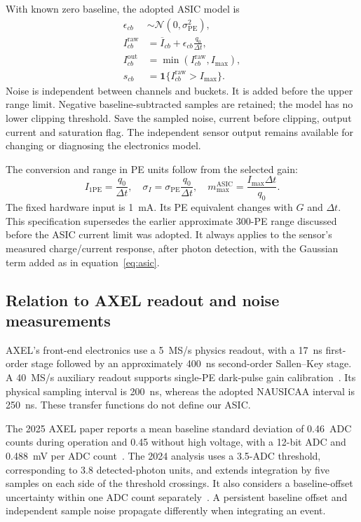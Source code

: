 \documentclass[11pt]{article}
\newcommand{\PE}{\mathrm{PE}}
\begin{document}
With known zero baseline, the adopted ASIC model is
\begin{align}
 \epsilon_{cb}&\sim\mathcal N(0,\sigma_{\PE}^2),\\
 I^{\mathrm{raw}}_{cb}&=\overline I_{cb}
       +\epsilon_{cb}\frac{q_0}{\Delta t},\\
 I^{\mathrm{out}}_{cb}&=\min(I^{\mathrm{raw}}_{cb},I_{\max}),\\
 s_{cb}&=\boldsymbol{1}\{I^{\mathrm{raw}}_{cb}>I_{\max}\}.
 \label{eq:asic}
\end{align}
Noise is independent between channels and buckets. It is added before the
upper range limit. Negative baseline-subtracted samples are retained; the
model has no lower clipping threshold. Save the sampled noise, current before
clipping, output current and saturation flag. The independent sensor output
remains available for changing or diagnosing the electronics model.

The conversion and range in PE units follow from the selected gain:
\begin{equation}
 I_{1\PE}=\frac{q_0}{\Delta t},\quad
 \sigma_I=\sigma_{\PE}\frac{q_0}{\Delta t},\quad
 m_{\max}^{\mathrm{ASIC}}=\frac{I_{\max}\Delta t}{q_0}.
 \label{eq:range}
\end{equation}
The fixed hardware input is 1~mA. Its PE equivalent changes with $G$ and
$\Delta t$. This specification supersedes the earlier approximate 300-PE
range discussed before the ASIC current limit was adopted. It always applies
to the sensor's measured charge/current response, after photon detection,
with the Gaussian term added as in equation~\eqref{eq:asic}.

\subsection{Relation to AXEL readout and noise measurements}
AXEL's front-end electronics use a 5~MS/s physics readout, with a 17~ns
first-order stage followed by an approximately 400~ns second-order
Sallen--Key stage. A 40~MS/s auxiliary readout supports single-PE dark-pulse
gain calibration~\cite{Nakamura2020AxFEB}. Its physical sampling interval is
200~ns, whereas the adopted NAUSICAA interval is 250~ns. These transfer
functions do not define our ASIC.

The 2025 AXEL paper reports a mean baseline standard deviation of 0.46~ADC
counts during operation and 0.45 without high voltage, with a 12-bit ADC and
0.488~mV per ADC count~\cite{Akiyama:2025dia}. The 2024 analysis uses a
3.5-ADC threshold, corresponding to 3.8 detected-photon units, and extends
integration by five samples on each side of the threshold crossings. It
also considers a baseline-offset uncertainty within one ADC count
separately~\cite{Yoshida2024AXELResponse}. A persistent baseline offset and
independent sample noise propagate differently when integrating an event.
\end{document}
